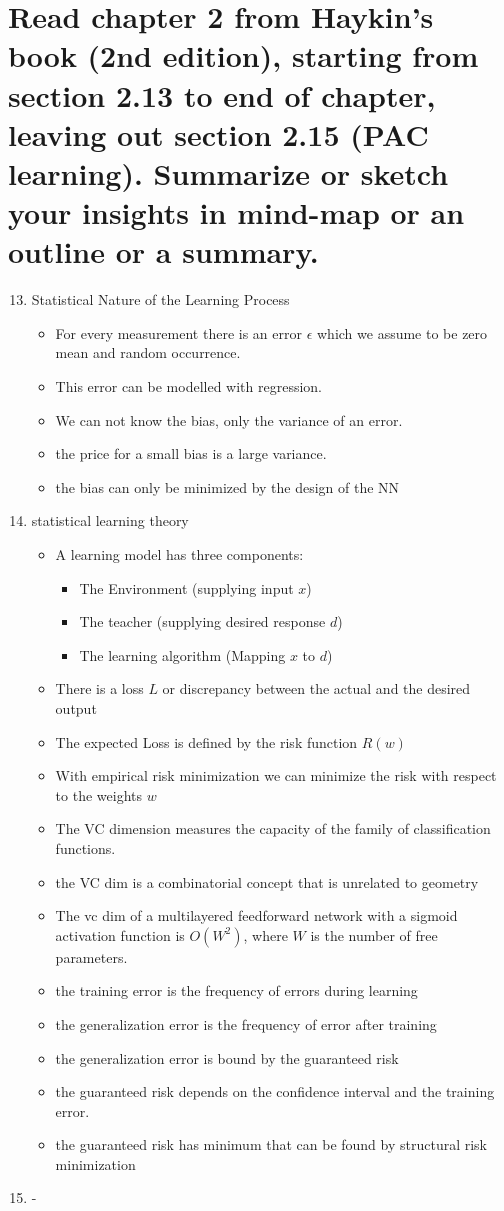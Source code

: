 \documentclass{scrartcl}
\begin{document}
\section{Read chapter 2 from Haykin’s book (2nd edition), starting from section 2.13 to end of
chapter, leaving out section 2.15 (PAC learning). Summarize or sketch your insights in
mind-map or an outline or a summary.
}
\begin{enumerate}
\setcounter{enumi}{12}
\item Statistical Nature of the Learning Process
	\begin{itemize}
	\item For every measurement there is an error $\epsilon$ which we assume to be zero mean and random occurrence.
	\item This error can be modelled with regression.
	\item We can not know the bias, only the variance of an error.
	\item the price for a small bias is a large variance.
	\item the bias can only be minimized by the design of the NN
	\end{itemize}
\item statistical learning theory
	\begin{itemize}
	\item A learning model has three components:
		\begin{itemize}
		\item The Environment (supplying input $x$)
		\item The teacher (supplying desired response $d$)
		\item The learning algorithm (Mapping $x$ to $d$)
		\end{itemize}
	\item There is a loss $L$ or discrepancy between the actual and the desired output
	\item The expected Loss is defined by the risk function $R(w)$
	\item With empirical risk minimization we can minimize the risk with respect to the weights $w$
	\item The VC dimension measures the capacity of the family of classification functions.
	\item the VC dim is a combinatorial concept that is unrelated to geometry
	\item The vc dim of a multilayered feedforward network with a sigmoid activation function is $O(W^{2})$, where $W$ is the number of free parameters.
	\item the training error is the frequency of errors during learning
	\item the generalization error is the frequency of error after training
	\item the generalization error is bound by the guaranteed risk
	\item the guaranteed risk depends on the confidence interval and the training error. 
	\item the guaranteed risk has minimum that can be found by structural risk minimization
	\end{itemize}
\item -


\end{enumerate}
\end{document}
